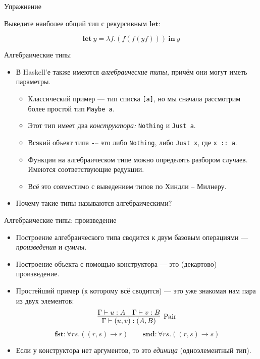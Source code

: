 \documentclass[xcolor=dvipsnames]{beamer}
\newcommand{\letin}[2]{\mathbf{let}\ {#1}\ \mathbf{in}\ {#2}}
\begin{document}
\begin{frame}{Упражнение}

Выведите наиболее общий тип с рекурсивным $\mathbf{let}$:

\[
 \letin{y = \lambda f. (f (f (y f)))}{y}
\]

 
\end{frame}




\begin{frame}{Алгебраические типы}

\begin{itemize}[<+->]
 \item В Haskell'е также имеются {\em алгебраические типы,} причём они могут иметь параметры.
 \begin{itemize}
 \item Классический пример --- тип списка \texttt{[a]}, но мы сначала рассмотрим более простой тип \texttt{Maybe a}.
 \item Этот тип имеет два {\em конструктора:} \texttt{Nothing} и \texttt{Just a}.
 \item Всякий объект типа \texttt --- это либо \texttt{Nothing}, либо \texttt{Just x}, где \texttt{x :: a}.
 \item Функции на алгебраическом типе можно определять разбором случаев. Имеются соответствующие редукции.
 \item Всё это совместимо с выведением типов по Хиндли -- Милнеру.
 \end{itemize}
 \item Почему такие типы называются алгебраическими?
\end{itemize}

 
\end{frame}

\begin{frame}{Алгебраические типы: произведение}
 
 \begin{itemize}[<+->]
  \item Построение алгебраического типа сводится к двум базовым операциями --- {\em произведения} и {\em суммы.}
  \item Построение объекта с помощью конструктора --- это (декартово) произведение. 
  \item Простейший пример (к которому всё сводится) --- это уже знакомая нам пара из двух элементов:
  \[
   \infer[\mathrm{Pair}]
   {\Gamma \vdash (u,v) : (A,B)}
   {\Gamma \vdash u : A & \Gamma \vdash v : B}
  \]
  \[
   \mathbf{fst} : \forall r s. ((r,s) \to r) \qquad
   \mathbf{snd} : \forall r s. ((r,s) \to s)
  \]
  \item Если у конструктора нет аргументов, то это {\em единица} (одноэлементный тип).
 \end{itemize}

\end{frame}
\end{document}
